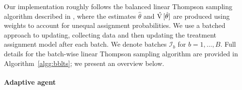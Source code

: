 \documentclass[letterpaper, 12pt, parskip=full,]{scrartcl}
\begin{document}
Our implementation roughly follows the balanced linear Thompson sampling algorithm described in \cite{dimakopoulou2017estimation, dimakopoulou2019balanced}, where the estimates $\hat\theta$ and $\hat{{\textrm V}\,}[\hat\theta]$ are produced using weights to account for unequal assignment probabilities. We use a batched approach to updating, collecting data and then updating the treatment assignment model after each batch. We denote batches $\mathcal{I}_b$ for $b = 1, \dots, B$. Full details for the batch-wise linear Thompson sampling algorithm are provided in Algorithm~\ref{algg:bblts}; we present an overview below. 

\paragraph{Adaptive agent}\label{agent}
\end{document}
